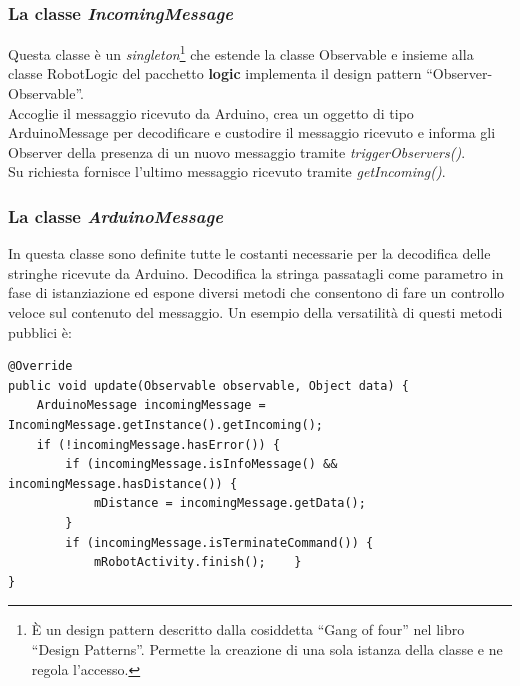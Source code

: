 \subsubsection{La classe \emph{IncomingMessage}}
Questa classe è un \emph{singleton}\footnote{È un design pattern descritto dalla 
cosiddetta ``Gang of four'' nel libro ``Design Patterns''. 
Permette la creazione di una sola istanza della classe e ne regola l'accesso.} 
che estende la classe Observable e insieme alla classe RobotLogic del 
pacchetto \textbf{logic} implementa il design pattern ``Observer-Observable''. 
\\Accoglie il messaggio ricevuto da Arduino, crea un oggetto di tipo ArduinoMessage 
per decodificare e custodire il messaggio ricevuto e informa gli Observer della presenza 
di un nuovo messaggio tramite \emph{triggerObservers()}.\\
Su richiesta fornisce l'ultimo messaggio ricevuto tramite \emph{getIncoming()}.

\subsubsection{La classe \emph{ArduinoMessage}}
In questa classe sono definite tutte le costanti necessarie per la 
decodifica delle stringhe ricevute da Arduino. 
Decodifica la stringa passatagli come parametro in fase di istanziazione ed 
espone diversi metodi che consentono di fare un controllo veloce sul contenuto del messaggio.
Un esempio della versatilità di questi metodi pubblici è:  
\lstset{language=Java}

\begin{lstlisting}[caption=Metodo \emph{update()} di RobotLogic del 
pacchetto \textbf{logic}]
@Override
public void update(Observable observable, Object data) {
    ArduinoMessage incomingMessage = IncomingMessage.getInstance().getIncoming();
    if (!incomingMessage.hasError()) {
        if (incomingMessage.isInfoMessage() && incomingMessage.hasDistance()) {
            mDistance = incomingMessage.getData();
        }
        if (incomingMessage.isTerminateCommand()) {
            mRobotActivity.finish();    }
}
\end{lstlisting}

